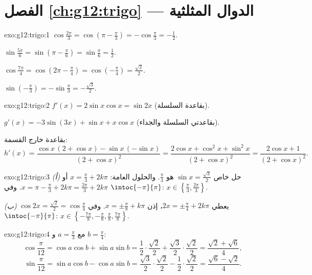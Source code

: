 \section*{الفصل \ref{ch:g12:trigo} --- الدوال المثلثية}

\begin{solution}{exo:g12:trigo:1}
$\cos\frac{2\pi}{3} = \cos\left(\pi - \frac\pi3\right) = -\cos\frac\pi3
= -\frac12$.

$\sin\frac{5\pi}{6} = \sin\left(\pi - \frac\pi6\right) = \sin\frac\pi6
= \frac12$.

$\cos\frac{7\pi}{4} = \cos\left(2\pi - \frac{\pi}{4}\right)
= \cos\left(-\frac\pi4\right) = \frac{\sqrt2}{2}$.

$\sin\left(-\frac\pi3\right) = -\sin\frac\pi3 = -\frac{\sqrt3}{2}$.
\end{solution}

\begin{solution}{exo:g12:trigo:2}
$f'(x) = 2\sin x\cos x = \sin 2x$ (بقاعدة السلسلة).

$g'(x) = -3\sin(3x) + \sin x + x\cos x$ (بقاعدتي السلسلة والجداء).

بقاعدة خارج القسمة:
\[
h'(x) = \frac{\cos x\,(2 + \cos x) - \sin x\,(-\sin x)}{(2+\cos x)^2}
= \frac{2\cos x + \cos^2 x + \sin^2 x}{(2+\cos x)^2}
= \frac{2\cos x + 1}{(2+\cos x)^2}.
\]
\end{solution}

\begin{solution}{exo:g12:trigo:3}
\emph{(أ)} حل خاص  $\sin x = \frac{\sqrt3}{2}$ هو
$\frac\pi3$. والحلول العامة: $x = \frac\pi3 + 2k\pi$ أو
$x = \pi - \frac\pi3 + 2k\pi = \frac{2\pi}{3} + 2k\pi$. وفي
$\intoc{-\pi}{\pi}$: $x \in \left\{\frac\pi3, \frac{2\pi}{3}\right\}$.

\emph{(ب)} $\cos 2x = \frac{\sqrt2}{2} = \cos\frac\pi4$ يعطي
$2x = \pm\frac\pi4 + 2k\pi$، إذن $x = \pm\frac\pi8 + k\pi$. وفي
$\intoc{-\pi}{\pi}$:
$x \in \left\{-\frac{7\pi}{8}, -\frac\pi8, \frac\pi8, \frac{7\pi}{8}\right\}$.
\end{solution}

\begin{solution}{exo:g12:trigo:4}
مع $a = \frac\pi3$ و $b = \frac\pi4$:
\[
\cos\frac{\pi}{12} = \cos a\cos b + \sin a \sin b
= \frac12\cdot\frac{\sqrt2}{2} + \frac{\sqrt3}{2}\cdot\frac{\sqrt2}{2}
= \frac{\sqrt2 + \sqrt6}{4},
\]
\[
\sin\frac{\pi}{12} = \sin a\cos b - \cos a \sin b
= \frac{\sqrt3}{2}\cdot\frac{\sqrt2}{2} - \frac12\cdot\frac{\sqrt2}{2}
= \frac{\sqrt6 - \sqrt2}{4}.
\]
\end{solution}

